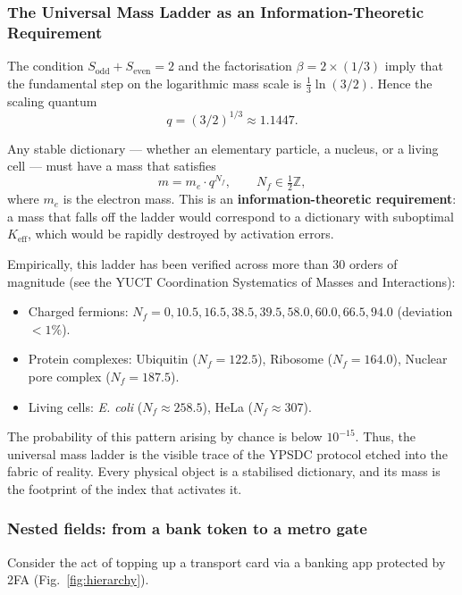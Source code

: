\documentclass[12pt,a4paper]{article}
\theoremstyle{remark}
\begin{document}
	\subsubsection{The Universal Mass Ladder as an Information-Theoretic Requirement}
	
	The condition \(S_{\mathrm{odd}} + S_{\mathrm{even}} = 2\) and the factorisation
	\(\beta = 2 \times (1/3)\) imply that the fundamental step on the logarithmic
	mass scale is \(\frac{1}{3}\ln(3/2)\).  Hence the scaling quantum
	\[
	q = (3/2)^{1/3} \approx 1.1447.
	\]
	
	Any stable dictionary --- whether an elementary particle, a nucleus, or a living
	cell --- must have a mass that satisfies
	\[
	m = m_e \cdot q^{N_f}, \qquad N_f \in \tfrac{1}{2}\mathbb{Z},
	\]
	where \(m_e\) is the electron mass.  This is an \textbf{information-theoretic
		requirement}: a mass that falls off the ladder would correspond to a dictionary
	with suboptimal \(K_{\mathrm{eff}}\), which would be rapidly destroyed by
	activation errors.
	
	Empirically, this ladder has been verified across more than 30 orders of
	magnitude (see the YUCT Coordination Systematics of Masses and Interactions):
	\begin{itemize}
		\item Charged fermions: \(N_f = 0, 10.5, 16.5, 38.5, 39.5, 58.0, 60.0, 66.5, 94.0\)
		(deviation \(< 1\%\)).
		\item Protein complexes: Ubiquitin (\(N_f = 122.5\)), Ribosome (\(N_f = 164.0\)),
		Nuclear pore complex (\(N_f = 187.5\)).
		\item Living cells: \textit{E. coli} (\(N_f \approx 258.5\)), HeLa (\(N_f \approx 307\)).
	\end{itemize}
	
	The probability of this pattern arising by chance is below \(10^{-15}\).  Thus,
	the universal mass ladder is the visible trace of the YPSDC protocol etched into
	the fabric of reality.  Every physical object is a stabilised dictionary, and its
	mass is the footprint of the index that activates it.
	
	\subsubsection{Nested fields: from a bank token to a metro gate}
	
	Consider the act of topping up a transport card via a banking app
	protected by 2FA (Fig.~\ref{fig:hierarchy}).
	
\end{document}
